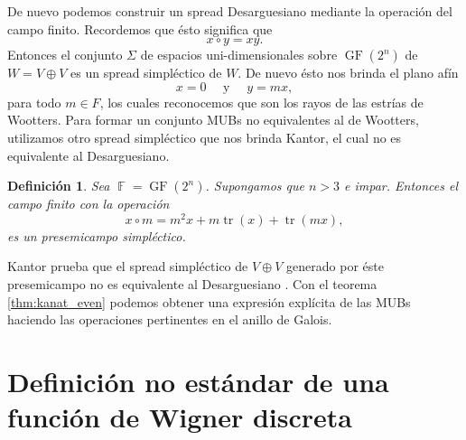 \documentclass[a4paper]{report}
\DeclareMathOperator{\F}{\mathbb{F}}
\DeclareMathOperator{\tr}{tr}
\DeclareMathOperator{\GF}{GF}
\newtheorem{definition}{Definición}
\begin{document}
  De nuevo podemos construir un spread Desarguesiano
  mediante la operación del campo finito. Recordemos que
  ésto significa que
  \[
    x \circ y = xy.
  \] 
  Entonces el conjunto $\Sigma$ de espacios
  uni-dimensionales sobre $\GF(2^{n})$ de $W = V \oplus V$
  es un spread simpléctico de $W$. De nuevo ésto nos brinda
  el plano afín
  \[
    x = 0
    \quad \text{ y } \quad
    y = mx,
  \]
  para todo $m \in F$, los cuales reconocemos que son los
  rayos de las estrías de Wootters. Para formar un conjunto
  MUBs no equivalentes al de Wootters, utilizamos otro
  spread simpléctico que nos brinda Kantor, el cual no es
  equivalente al Desarguesiano.
  \begin{definition}
    \label{def:kantor_even_alt}
    Sea $\F = \GF(2^{n})$. Supongamos que $n >
    3$ e impar. Entonces el campo finito con la operación
    \begin{equation}
      x \circ m
      = m^2x + m\tr(x) + \tr(mx),
    \end{equation}
    es un presemicampo simpléctico.
  \end{definition}
  Kantor prueba que el spread simpléctico de $V \oplus V$
  generado por éste presemicampo no es equivalente al
  Desarguesiano \cite{kantor2012}. Con el teorema
  \ref{thm:kanat_even} podemos obtener una expresión
  explícita de las MUBs haciendo las operaciones pertinentes
  en el anillo de Galois.

  \section{Definición no estándar de una función de Wigner
  discreta}
\end{document}
